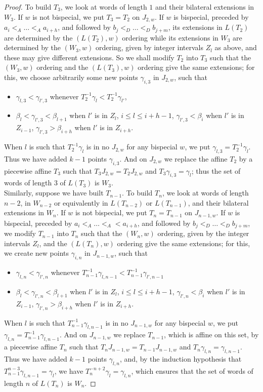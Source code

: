 \documentclass[12pt,a4paper]{amsart}
\begin{document}
\begin{proof}
To build $T_3$, we look at words of length $1$ and their bilateral extensions in $W_3$. If $w$ is not bispecial, we put $T_3=T_2$ on $J_{2,w}$. If $w$ is bispecial, preceded by $a_i<_A\ldots <_A a_{i+h}$, and followed by $b_j<_D\ldots <_D b_{j+m}$, its extensions in $L(T_2)$ are determined by the $(L(T_2),w)$ ordering
 while its extensions in $W_3$ are determined by the $(W_3, w)$ ordering, given by integer intervals $Z_l$ as above, and these may give different extensions. So we shall modify $T_2$ into $T_3$ such that  the $(W_3, w)$ ordering and the $(L(T_3), w)$ ordering  give the same extensions; for this, we choose arbitrarily some new points
  $\gamma_{i,3}$ in $J_{2,w}$, 
 such that 
 \begin{itemize}
 \item $\gamma_{l,3}<\gamma_{l',3}$ whenever $T_2^{-1}\gamma_l<T_2^{-1}\gamma_{l'}$,
 \item   $\beta_l<\gamma_{l',3}< \beta_{l+1}$ when $l'$ is in $Z_l$, $i\leq l\leq i+h-1$, $\gamma_{l',3}< \beta_i$ when $l'$ is in $Z_{i-1}$, $\gamma_{l',3}> \beta_{i+h}$ when $l'$ is in $Z_{i+h}$.
\end{itemize}
 When $l$ is such that $T_2^{-1}\gamma_l$ is in no $J_{2,w}$ for any bispecial $w$, we put $\gamma_{l,3}=T_2^{-1}\gamma_l$. Thus we  have added $k-1$ points $\gamma_{i,3}$. And on $J_{2,w}$ we replace the affine $T_2$ by  a piecewise affine $T_3$  such that  $T_3J_{2,w}=T_2J_{2,w}$ 
  and $T_3\gamma_{i,3}=\gamma_l$; thus  the set of words of length $3$ of $L(T_3)$ is $W_3$. \\

Similarly, suppose we have built $T_{n-1}$. To build $T_n$, we look at words of length $n-2$, in $W_{n-2}$  or equivalently in  $L(T_{n-2})$ or  $L(T_{n-1})$,  and their bilateral extensions in $W_n$. If $w$ is not bispecial, we put $T_n=T_{n-1}$ on $J_{n-1,w}$. If $w$ is bispecial, preceded by $a_i<_A\ldots <_A <a_{i+h}$, and followed by $b_j<_D\ldots <_D b_{j+m}$, we modify $T_{n-1}$ into $T_n$ such that  the $(W_n, w)$ ordering, given by the integer intervals $Z_l$, and the $(L(T_n), w)$ ordering  give the same extensions; for this, we create new points $\gamma_{i,n}$ in $J_{n-1,w}$, such 
that 
 \begin{itemize}
 \item $\gamma_{l,n}<\gamma_{l',n}$ whenever $T_{n-1}^{-1}\gamma_{l,n-1}<T_{n-1}^{-1}\gamma_{l',n-1}$ 
  \item   $\beta_l<\gamma_{l',n}< \beta_{l+1}$ when $l'$ is in $Z_l$, $i\leq l\leq i+h-1$, $\gamma_{l',n}< \beta_i$ when $l'$ is in $Z_{i-1}$, $\gamma_{l',n}> \beta_{i+h}$ when $l'$ is in $Z_{i+h}$.
\end{itemize}
When $l$ is such that $T_{n-1}^{-1}\gamma_{l,n-1}$ is in no $J_{n-1,w}$ for any bispecial $w$, we  put $\gamma_{l,n}=T_{n-1}^{-1}\gamma_{l,n-1}$. And on $J_{n-1,w}$ we replace $T_{n-1}$, which is affine on this set, by  a piecewise affine $T_n$  such that 
 $T_nJ_{n-1,w}=T_{n-1}J_{n-1,w}$  and $T_n\gamma_{l,n}=\gamma_{l,n-1}$. Thus we  have added $k-1$ points $\gamma_{l,n}$, and, by the induction hypothesis  that $T_{n-1}^{n-3}\gamma_{l,n-1}=\gamma_l$, we have   $T_n^{-n+2}\gamma_l=\gamma_{l,n}$, which ensures that  the set of words of length $n$ of $L(T_n)$ is $W_n$. 



\end{proof}
\end{document}
